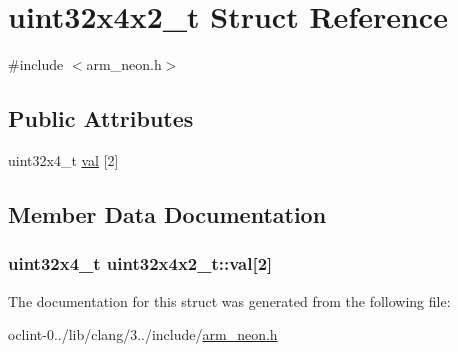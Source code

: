 \hypertarget{structuint32x4x2__t}{\section{uint32x4x2\-\_\-t Struct Reference}
\label{structuint32x4x2__t}
}


{\ttfamily \#include $<$arm\-\_\-neon.\-h$>$}

\subsection*{Public Attributes}
\begin{DoxyCompactItemize}
\item 
uint32x4\-\_\-t \hyperlink{structuint32x4x2__t_a9a2d00c2937756a6a467011e6282b63b}{val} \mbox{[}2\mbox{]}
\end{DoxyCompactItemize}


\subsection{Member Data Documentation}
\hypertarget{structuint32x4x2__t_a9a2d00c2937756a6a467011e6282b63b}{
\subsubsection[{val}]{\setlength{\rightskip}{0pt plus 5cm}uint32x4\-\_\-t uint32x4x2\-\_\-t\-::val\mbox{[}2\mbox{]}}}\label{structuint32x4x2__t_a9a2d00c2937756a6a467011e6282b63b}


The documentation for this struct was generated from the following file\-:\begin{DoxyCompactItemize}
\item 
oclint-\/0../lib/clang/3../include/\hyperlink{arm__neon_8h}{arm\-\_\-neon.\-h}\end{DoxyCompactItemize}
